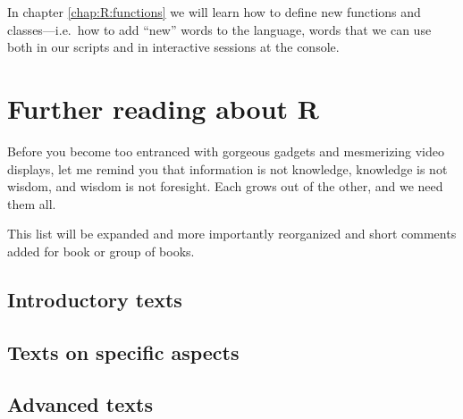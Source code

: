 \documentclass[krantz2]{krantz}\usepackage{knitr}%
\begin{document}
In chapter \ref{chap:R:functions} we will learn how to define new functions and classes---i.e.\ how to add ``new'' words to the \Rlang language, words that we can use both in our scripts and in interactive sessions at the \Rpgrm console. 











\chapter{Further reading about R}\label{chap:R:readings}

\begin{VF}
Before you become too entranced with gorgeous gadgets and mesmerizing video displays, let me remind you that information is not knowledge, knowledge is not wisdom, and wisdom is not foresight. Each grows out of the other, and we need them all.

\end{VF}


\begin{warningbox}
  This list will be expanded and more importantly reorganized and short comments added for book or group of books.
\end{warningbox}

\section{Introductory texts}

\cite{Allerhand2011,Dalgaard2008,Zuur2009,Teetor2011,Peng2017,Paradis2005,Peng2016}

\section{Texts on specific aspects}

\cite{Chang2013,Fox2002,Fox2010,Faraway2004,Faraway2006,Everitt2011,Wickham2017}

\section{Advanced texts}
\end{document}
